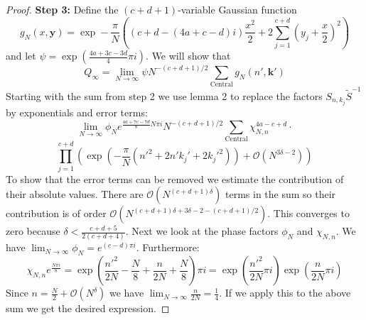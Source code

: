 \documentclass[letterpaper]{article}
\begin{document}
\begin{proof}
\noindent \textbf{Step 3:} Define the $(c+d+1)$-variable Gaussian function
$$g_N(x,\mathbf{y}) = \exp-\frac{\pi}{N}\left(( c+d
-(4a+c-d)i)\frac{x^2}{2}+2\sum_{j=1}^{c+d}(y_j+\frac{x}{2})^2\right)$$
and let $\psi = \exp(\frac{4a+3c-3d}{4}\pi i)$. We will show that
$$Q_\infty  = \lim_{N \to \infty}\psi
N^{-(c+d+1)/2}\sum_{\mathrm{Central}}g_N(n',\mathbf{k'})$$
Starting with the sum from step 2 we use lemma 2 to replace the
factors $S_{n,k_j}\tilde{S}^{-1}$ by exponentials and error terms:
$$\lim_{N\to\infty}\phi_N e^{\frac{4a+7c-7d}{8}N\pi i} N^{-(c+d+1)/2}\sum_{\mathrm{Central}}\chi_{N,n}^{4a-c+d}\cdot$$ $$\prod_{j=1}^{c+d}\left(\exp(-\frac{\pi}{N}(n'^2+2n'k_j' + 2k_j'^2))+\mathcal{O}(N^{3\delta-2})\right)$$ To show that the error terms can be removed we estimate the contribution of their absolute values. There are $\mathcal{O}(N^{(c+d+1)\delta})$ terms in the sum so their contribution is of order $\mathcal{O}(N^{(c+d+1)\delta+3\delta-2-(c+d+1)/2})$. This converges to zero because $\delta <\frac{c+d+5}{2(c+d+4)}$. \newline
Next we look at the phase factors $\phi_N$ and $\chi_{N,n}$. We
have $\lim_{N\to \infty}\phi_N =e^{(c-d)\pi i}$. Furthermore:
$$\chi_{N,n}e^{\frac{N\pi i}{8}} =
\exp(\frac{n'^2}{2N}-\frac{N}{8}+\frac{n}{2N}+\frac{N}{8})\pi i =
\exp(\frac{n'^2}{2N}\pi i) \exp(\frac{n}{2N}\pi i)$$ Since
$n=\frac{N}{2}+\mathcal{O}(N^\delta)$ we have
$\lim_{N\to\infty}\frac{n}{2N} = \frac{1}{4}$.  If we apply this
to the above sum we get the desired expression.
\newline


\end{proof}
\end{document}
